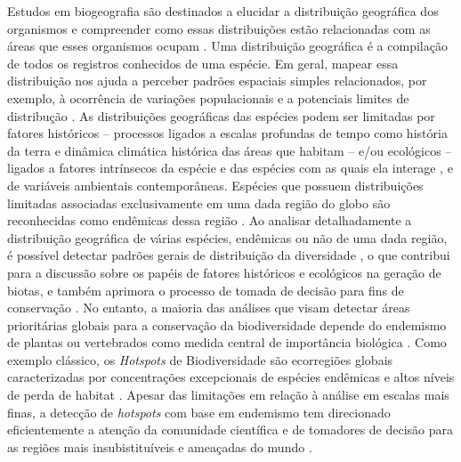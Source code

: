 \documentclass[12pt,openright,oneside,a4paper,english]{abntex2}
\begin{document}
Estudos em biogeografia são destinados a elucidar a distribuição geográfica dos organismos e compreender como essas distribuições estão relacionadas com as áreas que esses organismos ocupam \citep{Carvalho2016}. Uma distribuição geográfica é a compilação de todos os registros conhecidos de uma espécie. Em geral, mapear essa distribuição nos ajuda a perceber padrões espaciais simples relacionados, por exemplo, à ocorrência de variações populacionais e a potenciais limites de distribução \citep{Gaston2003}. As distribuições geográficas das espécies podem ser limitadas por fatores históricos – processos ligados a escalas profundas de tempo como história da terra e dinâmica climática histórica das áreas que habitam – e/ou ecológicos – ligados a fatores intrínsecos da espécie e das espécies com as quais ela interage \citep{Cox2016}, e de variáveis ambientais contemporâneas. Espécies que possuem distribuições limitadas associadas exclusivamente em uma dada região do globo são reconhecidas como endêmicas dessa região \citep{Cox2016}. Ao analisar detalhadamente a distribuição geográfica de várias espécies, endêmicas ou não de uma dada região, é possível detectar padrões gerais de distribuição da diversidade \citep{Brown1995}, o que contribui para a discussão sobre os papéis de fatores históricos e ecológicos na geração de biotas, e também aprimora o processo de tomada de decisão para fins de conservação \citep{Hausdorf2002, Whittaker2005}. No entanto, a maioria das análises que visam detectar áreas prioritárias globais para a conservação da biodiversidade depende do endemismo de plantas ou vertebrados como medida central de importância biológica \citep{Brooks2006}. Como exemplo clássico, os \textit{Hotspots} de Biodiversidade são ecorregiões globais caracterizadas por concentrações excepcionais de espécies endêmicas e altos níveis de perda de habitat \citep{Myers2000}. Apesar das limitações em relação à análise em escalas mais finas, a detecção de \textit{hotspots} com base em endemismo tem direcionado eficientemente a atenção da comunidade científica e de tomadores de decisão para as regiões mais insubistituíveis e ameaçadas do mundo \citep{Reid1998, Brooks2006}.
\end{document}
